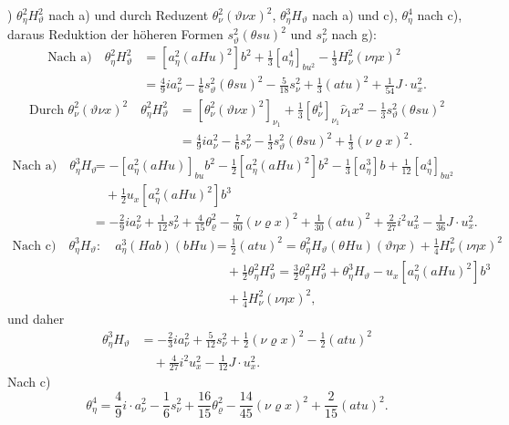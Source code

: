 ) $\theta_\eta^2H_\vartheta^2$ nach a) und durch Reduzent $\theta_\nu^2(\vartheta\nu x)^2$, $\theta_\eta^3H_\vartheta$ nach a) und c), $\theta_\eta^4$ nach c), daraus Reduktion der höheren Formen $s_\vartheta^2(\theta su)^2$ und $s_\nu^2$ nach g):
\[
\begin{aligned}
\text{Nach a)}\quad
\theta_\eta^2H_\vartheta^2&=[a_\eta^2(aHu)^2]b^2+\frac13[a_\eta^4]_{bu^2}-\frac13H_\nu^2(\nu\eta x)^2\\
&=\frac49ia_\nu^2-\frac16s_\vartheta^2(\theta su)^2-\frac5{18}s_\nu^2+\frac13(atu)^2+\frac1{54}J\cdot u_x^2.
\end{aligned}
\]
\[
\begin{aligned}
\text{Durch }\theta_\nu^2(\vartheta\nu x)^2\quad
\theta_\eta^2H_\vartheta^2
&=[\theta_\nu^2(\vartheta\nu x)^2]_{\nu_1}+\frac13[\theta_\nu^4]_{\nu_1}\widehat{\nu}_1x^2-\frac13s_\vartheta^2(\theta su)^2\\
&=\frac49ia_\nu^2-\frac16s_\nu^2-\frac13s_\vartheta^2(\theta su)^2+\frac13(\nu\varrho x)^2.
\end{aligned}
\]
\[
\begin{aligned}
\text{Nach a)}\quad
\theta_\eta^3H_\vartheta&=-[a_\eta^2(aHu)]_{bu}b^2-\frac12[a_\eta^2(aHu)^2]b^2-\frac13[a_\eta^3]b+\frac1{12}[a_\eta^4]_{bu^2}\\
&\quad+\frac12u_x[a_\eta^2(aHu)^2]b^3\\
&=-\frac29ia_\nu^2+\frac1{12}s_\nu^2+\frac4{15}\theta_\varrho^2-\frac7{90}(\nu\varrho x)^2+\frac1{30}(atu)^2+\frac2{27}i^2u_x^2-\frac1{36}J\cdot u_x^2.
\end{aligned}
\]
\[
\begin{aligned}
\text{Nach c)}\quad
\theta_\eta^3H_\vartheta:\quad a_\eta^3(Hab)(bHu)&=\frac12(atu)^2
=\theta_\eta^2H_\vartheta(\theta Hu)(\vartheta\eta x)+\frac14H_\nu^2(\nu\eta x)^2\\
&\quad+\frac12\theta_\eta^2H_\vartheta^2
=\frac32\theta_\eta^2H_\vartheta^2+\theta_\eta^3H_\vartheta-u_x[a_\eta^2(aHu)^2]b^3\\
&\quad+\frac14H_\nu^2(\nu\eta x)^2,
\end{aligned}
\]
und daher
\[
\begin{aligned}
\theta_\eta^3H_\vartheta&=-\frac23ia_\nu^2+\frac5{12}s_\nu^2+\frac12(\nu\varrho x)^2-\frac12(atu)^2\\
&\quad+\frac4{27}i^2u_x^2-\frac1{12}J\cdot u_x^2.
\end{aligned}
\]
Nach c)
\[
\theta_\eta^4=\frac49i\cdot a_\nu^2-\frac16s_\nu^2+\frac{16}{15}\theta_\varrho^2-\frac{14}{45}(\nu\varrho x)^2+\frac2{15}(atu)^2.
\]
